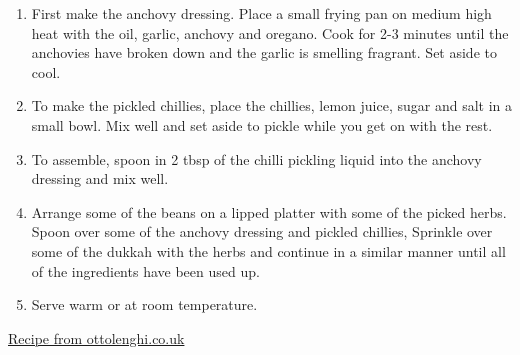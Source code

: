 \documentclass[11pt,a4paper]{article}
\begin{document}
\begin{enumerate}
  \item First make the anchovy dressing. Place a small frying pan on medium high heat with the oil, garlic, anchovy and oregano. Cook for 2-3 minutes until the anchovies have broken down and the garlic is smelling fragrant. Set aside to cool.
  \item To make the pickled chillies, place the chillies, lemon juice, sugar and salt in a small bowl. Mix well and set aside to pickle while you get on with the rest.
  \item To assemble, spoon in 2 tbsp of the chilli pickling liquid into the anchovy dressing and mix well.
  \item Arrange some of the beans on a lipped platter with some of the picked herbs. Spoon over some of the anchovy dressing and pickled chillies, Sprinkle over some of the dukkah with the herbs and continue in a similar manner until all of the ingredients have been used up.
  \item Serve warm or at room temperature.
\end{enumerate}

\href{https://ottolenghi.co.uk/pages/recipes/charred-green-beans-with-anchovy-dressing-and-seed-dukkah}{Recipe from ottolenghi.co.uk}
\end{document}
